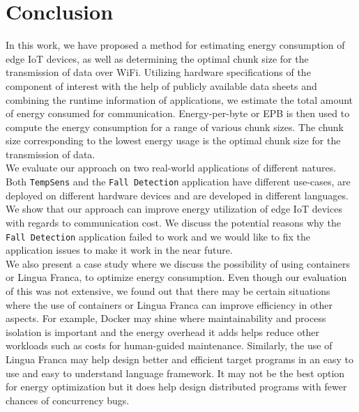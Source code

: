 \chapter{Conclusion}

In this work, we have proposed a method for estimating energy consumption of edge IoT devices, as well as 
determining the optimal chunk size for the transmission of data over WiFi. Utilizing hardware specifications 
of the component of interest with the help of publicly available data sheets and combining the runtime information 
of applications, we estimate the total amount of energy consumed for communication. Energy-per-byte or EPB is then 
used to compute the energy consumption for a range of various chunk sizes. The chunk size corresponding to the 
lowest energy usage is the optimal chunk size for the transmission of data. \\

We evaluate our approach on two real-world applications of different natures. Both \texttt{TempSens} and the 
\texttt{Fall Detection} application have different use-cases, are deployed on different hardware devices and 
are developed in different languages. We show that our approach can improve energy utilization of edge IoT devices 
with regards to communication cost. We discuss the potential reasons why the \texttt{Fall Detection} application 
failed to work and we would like to fix the application issues to make it work in the near future. \\

We also present a case study where we discuss the possibility of using containers or Lingua Franca, to optimize 
energy consumption. Even though our evaluation of this was not extensive, we found out that there may be 
certain situations where the use of containers or Lingua Franca can improve efficiency in other aspects. For 
example, Docker may shine where maintainability and process isolation is important and the energy overhead it adds 
helps reduce other workloads such as costs for human-guided maintenance. Similarly, the use of Lingua Franca may 
help design better and efficient target programs in an easy to use and easy to understand language framework. It 
may not be the best option for energy optimization but it does help design distributed programs with fewer chances 
of concurrency bugs. \\

